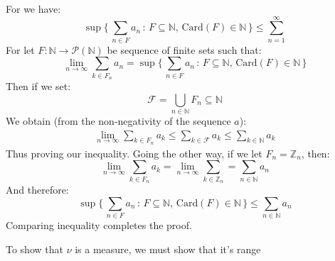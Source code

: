 \documentclass[crop=false,class=article]{standalone}                       %
\begin{document}
    \begin{solution}
        For we have:
        \begin{equation}
            \sup\Big\{\,
                \sum_{n\in{F}}a_{n}\,:\,F\subseteq\mathbb{N},\,
                \textrm{Card}(F)\in\mathbb{N}\,
            \Big\}
            \leq\sum_{n=1}^{\infty}
        \end{equation}
        For let $F:\mathbb{N}\rightarrow\mathcal{P}(\mathbb{N})$ be
        sequence of finite sets such that:
        \begin{equation}
            \underset{n\rightarrow\infty}{\lim}
                \sum_{k\in{F}_{n}}a_{n}
            =\sup\Big\{\,
                \sum_{n\in{F}}a_{n}\,:\,F\subseteq\mathbb{N},\,
                \textrm{Card}(F)\in\mathbb{N}\,
            \Big\}
        \end{equation}
        Then if we set:
        \begin{equation}
            \mathcal{F}=\bigcup_{n\in\mathbb{N}}F_{n}\subseteq\mathbb{N}
        \end{equation}
        We obtain (from the non-negativity of the sequence $a$):
        \begin{subequations}
            \begin{align}
                \underset{n\rightarrow\infty}{\lim}\sum_{k\in{F}_{n}}a_{k}
                \leq\sum_{k\in\mathcal{F}}a_{k}
                \leq\sum_{k\in\mathbb{N}}a_{k}
            \end{align}
        \end{subequations}
        Thus proving our inequality. Going the other way, if we let
        $F_{n}=\mathbb{Z}_{n}$, then:
        \begin{equation}
            \underset{n\rightarrow\infty}{\lim}\sum_{k\in{F}_{n}}a_{k}
            =\underset{n\rightarrow\infty}{\lim}\sum_{k\in\mathbb{Z}_{n}}
            =\sum_{n\in\mathbb{N}}a_{n}
        \end{equation}
        And therefore:
        \begin{equation}
            \sup\Big\{\,
                \sum_{n\in{F}}a_{n}\,:\,F\subseteq\mathbb{N},\,
                \textrm{Card}(F)\in\mathbb{N}\,
            \Big\}
            \leq\sum_{n\in\mathbb{N}}a_{n}
        \end{equation}
        Comparing inequality completes the proof.
        \par\hfill\par
        To show that $\nu$ is a measure, we must show that it's range

\end{solution}
\end{document}
